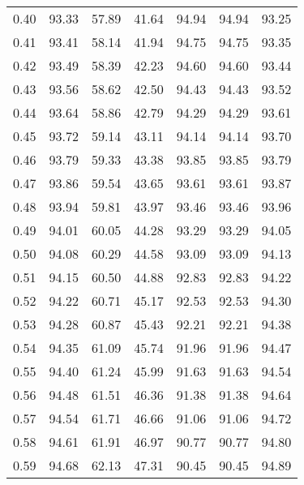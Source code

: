 \begin{tabular}{|c|c|c|c|c|c|c|}
      0.40 &     93.33 &     57.89 &      41.64 &   94.94 &      94.94 &         93.25 \\
      0.41 &     93.41 &     58.14 &      41.94 &   94.75 &      94.75 &         93.35 \\
      0.42 &     93.49 &     58.39 &      42.23 &   94.60 &      94.60 &         93.44 \\
      0.43 &     93.56 &     58.62 &      42.50 &   94.43 &      94.43 &         93.52 \\
      0.44 &     93.64 &     58.86 &      42.79 &   94.29 &      94.29 &         93.61 \\
      0.45 &     93.72 &     59.14 &      43.11 &   94.14 &      94.14 &         93.70 \\
      0.46 &     93.79 &     59.33 &      43.38 &   93.85 &      93.85 &         93.79 \\
      0.47 &     93.86 &     59.54 &      43.65 &   93.61 &      93.61 &         93.87 \\
      0.48 &     93.94 &     59.81 &      43.97 &   93.46 &      93.46 &         93.96 \\
      0.49 &     94.01 &     60.05 &      44.28 &   93.29 &      93.29 &         94.05 \\
      0.50 &     94.08 &     60.29 &      44.58 &   93.09 &      93.09 &         94.13 \\
      0.51 &     94.15 &     60.50 &      44.88 &   92.83 &      92.83 &         94.22 \\
      0.52 &     94.22 &     60.71 &      45.17 &   92.53 &      92.53 &         94.30 \\
      0.53 &     94.28 &     60.87 &      45.43 &   92.21 &      92.21 &         94.38 \\
      0.54 &     94.35 &     61.09 &      45.74 &   91.96 &      91.96 &         94.47 \\
      0.55 &     94.40 &     61.24 &      45.99 &   91.63 &      91.63 &         94.54 \\
      0.56 &     94.48 &     61.51 &      46.36 &   91.38 &      91.38 &         94.64 \\
      0.57 &     94.54 &     61.71 &      46.66 &   91.06 &      91.06 &         94.72 \\
      0.58 &     94.61 &     61.91 &      46.97 &   90.77 &      90.77 &         94.80 \\
      0.59 &     94.68 &     62.13 &      47.31 &   90.45 &      90.45 &         94.89 \\

\end{tabular}
